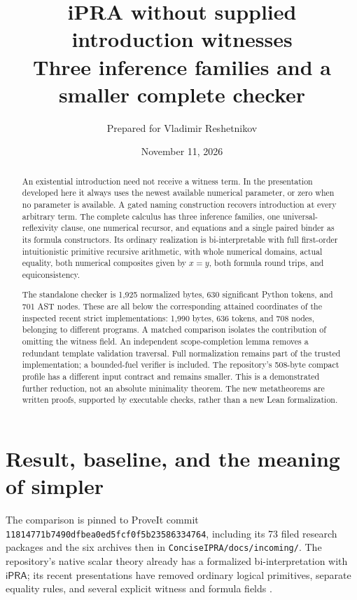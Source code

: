 \documentclass[11pt]{article}
\title{\textbf{iPRA without supplied introduction witnesses}\\[0.5em]
\large Three inference families and a smaller complete checker}
\author{Prepared for Vladimir Reshetnikov}
\date{November 11, 2026}
\theoremstyle{definition}\newtheorem{definition}[theorem]{Definition}
\theoremstyle{remark}\newtheorem{remark}[theorem]{Remark}
\newcommand{\ipra}{\mathsf{iPRA}}
\newcommand{\file}[1]{\texttt{\small\nolinkurl{#1}}}
\begin{document}
\maketitle
\begin{abstract}
An existential introduction need not receive a witness term. In the
presentation developed here it always uses the newest available numerical
parameter, or zero when no parameter is available. A gated naming
construction recovers introduction at every arbitrary term. The complete
calculus has three inference families, one universal-reflexivity clause,
one numerical recursor, and equations and a single paired binder as its
formula constructors. Its ordinary realization is bi-interpretable with
full first-order intuitionistic primitive recursive arithmetic, with
whole numerical domains, actual equality, both numerical composites
given by $x=y$, both formula round trips, and equiconsistency.

The standalone checker is 1,925 normalized bytes, 630 significant Python
tokens, and 701 AST nodes. These are all below the corresponding attained
coordinates of the inspected recent strict implementations: 1,990 bytes,
636 tokens, and 708 nodes, belonging to different programs. A matched
comparison isolates the contribution of omitting the witness field.
An independent scope-completion lemma removes a redundant template
validation traversal. Full normalization remains part of the trusted
implementation; a bounded-fuel verifier is included. The repository's
508-byte compact profile has a different input contract and remains
smaller. This is a demonstrated further reduction, not an absolute
minimality theorem. The new metatheorems are written proofs, supported
by executable checks, rather than a new Lean formalization.
\end{abstract}

\section{Result, baseline, and the meaning of simpler}
\label{sec:baseline}

The comparison is pinned to ProveIt commit
\texttt{11814771b7490dfbea0ed5fcf0f5b23586334764}, including its
73 filed research packages and the six archives then in
\file{ConciseIPRA/docs/incoming/}. The repository's native scalar theory
already has a formalized bi-interpretation with $\ipra$; its recent
presentations have removed ordinary logical primitives, separate
equality rules, and several explicit witness and formula fields
\cite{repo,nativebi,diagonal,clausaldiag}.
\end{document}
